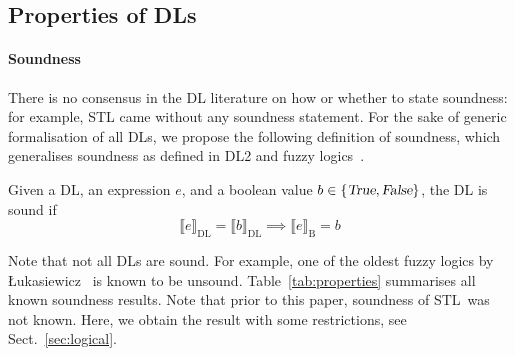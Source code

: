 \documentclass[a4paper,UKenglish,cleveref, autoref, thm-restate]{lipics-v2021}
\def\DL{\textrm{DL}}
\def\DLtwo{\textrm{DL2}}
\def\STL{\textrm{STL}}
\def\True{\textsl{True}}
\def\False{\textsl{False}}
\newcommand{\tbool}[1]{\llbracket #1 \rrbracket_{\textrm{B}}}
\newcommand{\tempty}[1]{\llbracket #1 \rrbracket}
\begin{document}
\begin{table}[t]
\caption{Interpretation function $\tempty{\cdot}_{\DL}$, which extends naturally
to sequences of expressions as well as interpretation function $\tbool{\cdot}$,
which is a structural interpretation of boolean formulas.\\
{\footnotesize $\dag$: Negation is undefined in the sense that it is not defined
as a structural transformation of the syntax of formulas. It is implemented at
the level of atomic comparison only, and negation on composite formulas is provided
as syntactic sugar~\cite[Sect.~3]{fischer2019dl2}. For example, consider
$\tempty{3 = 3}_{\DLtwo} = 0$. In $\DLtwo$, $\tempty{\neg (3 = 3)}_{\DLtwo}$ is not
defined in term of  $\tempty{3 = 3}_{\DLtwo}=0$, but $\DLtwo$ provides an
interpretation for the symbol $\neq$ separately.}}
\label{tab:semantics-math}
\end{table}

\subsection{Properties of DLs}
\label{sec:propertiesDLs}

\paragraph*{Soundness}
There is no consensus in the DL literature on how or whether to state soundness:
for example, \STL{} came without any soundness statement.
For the sake of generic formalisation of all DLs, we propose the following definition of soundness,
which generalises soundness as defined in \DLtwo{} and fuzzy 
logics~\cite{fischer2019dl2,van2022analyzing}. 

\begin{definition}[Soundness]
	\label{def:sound}
Given a DL, an expression $e$, and a boolean value $b \in 
\{\True, \False\}$, the DL is sound if 
\begin{equation*}
\tempty{e}_{\DL{}} = \tempty{b}_{\DL{}} \implies \tbool{e} = b
\end{equation*}
\end{definition}

Note that not all DLs are sound. For example,  one of the oldest fuzzy logics 
by  
Łukasiewicz~\cite{lukasiewicz1920three} is known to be unsound. 
Table~\ref{tab:properties} summarises all known soundness results. Note that 
prior to this paper, soundness of \STL\ was not known. Here, we obtain the
result with some restrictions, see Sect.~\ref{sec:logical}.
\end{document}
